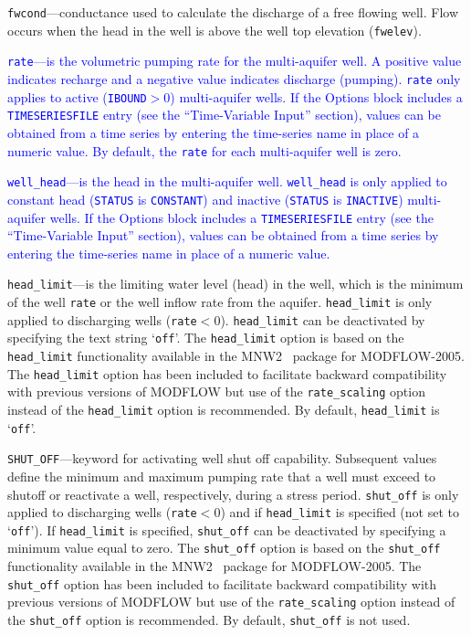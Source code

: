 \begin{description}
\item \texttt{fwcond}---conductance used to calculate the discharge of a free flowing well.  Flow occurs when the head in the well is above the well top elevation (\texttt{fwelev}).

\item \textcolor{blue}{\texttt{rate}---is the volumetric pumping rate for the multi-aquifer well. A positive value indicates recharge and a negative value indicates discharge (pumping). \texttt{rate} only applies to active (\texttt{IBOUND}$>0$) multi-aquifer wells. If the Options block includes a \texttt{TIMESERIESFILE} entry (see the ``Time-Variable Input'' section), values can be obtained from a time series by entering the time-series name in place of a numeric value. By default, the \texttt{rate} for each multi-aquifer well is zero.}

\item \textcolor{blue}{\texttt{well\_head}---is the head in the multi-aquifer well. \texttt{well\_head} is only applied to constant head (\texttt{STATUS} is \texttt{CONSTANT}) and inactive (\texttt{STATUS} is \texttt{INACTIVE}) multi-aquifer wells. If the Options block includes a \texttt{TIMESERIESFILE} entry (see the ``Time-Variable Input'' section), values can be obtained from a time series by entering the time-series name in place of a numeric value.}

\item \texttt{head\_limit}---is the limiting water level (head) in the well, which is the minimum of the well \texttt{rate} or the well inflow rate from the aquifer. \texttt{head\_limit} is only applied to discharging wells (\texttt{rate}$<0$). \texttt{head\_limit} can be deactivated by specifying the text string `\texttt{off}'. The \texttt{head\_limit} option is based on the \texttt{head\_limit} functionality available in the MNW2~\citep{konikow2009} package for MODFLOW-2005. The \texttt{head\_limit} option has been included to facilitate backward compatibility with previous versions of MODFLOW but use of the \texttt{rate\_scaling} option instead of the \texttt{head\_limit} option is recommended. By default, \texttt{head\_limit} is `\texttt{off}'.

\item \texttt{SHUT\_OFF}---keyword for activating well shut off capability.  Subsequent values define the minimum and maximum pumping rate that a well must exceed to shutoff or reactivate a well, respectively, during a stress period. \texttt{shut\_off} is only applied to discharging wells (\texttt{rate}$<0$) and if \texttt{head\_limit} is specified (not set to `\texttt{off}').  If \texttt{head\_limit} is specified, \texttt{shut\_off} can be deactivated by specifying a minimum value equal to zero. The \texttt{shut\_off} option is based on the \texttt{shut\_off} functionality available in the MNW2~\citep{konikow2009} package for MODFLOW-2005. The \texttt{shut\_off} option has been included to facilitate backward compatibility with previous versions of MODFLOW but use of the \texttt{rate\_scaling} option instead of the \texttt{shut\_off} option is recommended. By default, \texttt{shut\_off} is not used.


\end{description}
